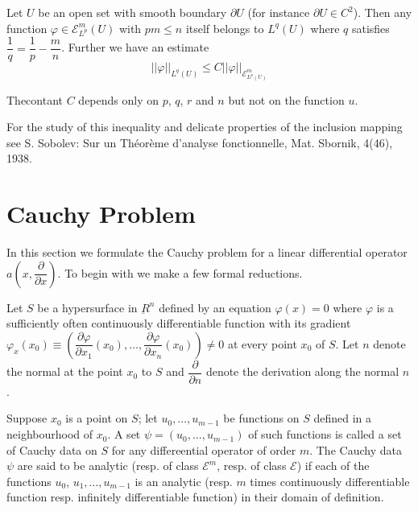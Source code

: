 \begin{theorem}[Sobolev]\label{chap1-thm1} %
  Let $U$ be an open set with smooth boundary $\partial U$ (for instance
  $\partial U \in C^2$). Then any function $\varphi \in
  \mathscr{E}^m_{L^p}(U)$ with $pm \leq n$ itself belongs to $L^q (U)$
  where $q$ satisfies $\dfrac{1}{q} = \dfrac{1}{p} -
  \dfrac{m}{n}$. Further we have an estimate 
\begin{equation}
|| \varphi ||_{L^q (U)} \leq C || \varphi ||_{\mathscr{E}^m_{L^p
    (U)}} \tag{1.6} \label{chap1-eq1.6}
\end{equation}

The\pageoriginale contant $C$ depends only on $p$, $q$, $r$ and $n$
but not on the function $u$. 
\end{theorem}

For the study of this inequality and delicate properties of the
inclusion mapping see S. Sobolev: Sur un Th\'eor\`eme d'analyse
fonctionnelle,  Mat. Sbornik,  4(46), 1938. 

\section{Cauchy Problem}\label{chap1-sec2} %

In this section we formulate the Cauchy problem for a linear
differential operator $a\left(x,  \dfrac {\partial}{\partial
  x}\right)$. To begin with we make a few formal reductions. 

Let $S$ be a hypersurface in $\underbar{R}^n$ defined by an equation
$\varphi (x) = 0$ where $\varphi$ is a sufficiently often continuously
differentiable function with its gradient $\varphi_x (x_0)\equiv
\left(\dfrac{\partial \varphi}{\partial x_1} (x_0), \ldots ,
\dfrac{\partial \varphi}{\partial x_n}(x_0)\right) \neq 0$ at every point
$x_0$ of $S$. Let $n$ denote the normal at the point $x_0$ to $S$ and
$\dfrac{\partial}{\partial n}$ denote the derivation along the normal
$n$. 

Suppose $x_0$ is a point on $S$;  let $u_0,  \ldots , u_{m-1}$ be
functions on $S$ defined in a neighbourhood of $x_0$. A set $\psi =
(u_0,  \ldots,  u_{m-1})$ of such functions is called a set of Cauchy
data on $S$ for any differeential operator of order $m$. The Cauchy
data $\psi$ are said to be  analytic (resp. of class $\mathscr{E}^m$,
resp. of class $\mathscr{E}$) if each of the functions $u_0$, $u_1,
\ldots , u_{m-1}$ is an analytic (resp. $m$ times continuously
differentiable function resp. infinitely differentiable function) in
their domain of definition. 

